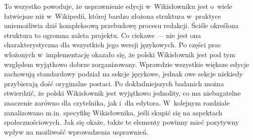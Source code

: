 To wszystko powoduje, że usprawnienie edycji w~Wikisłowniku jest o~wiele łatwiejsze niż w~Wikipedii, której bardzo złożona struktura w~praktyce uniemożliwia dziś kompleksową przebudowę procesu redakcji. Ściśle określona struktura to ogromna zaleta projektu. Co ciekawe --- nie jest ona charakterystyczna dla wszystkich jego wersji językowych. Po części prac włożonych w~implementację okazało się, że polski Wikisłownik jest pod tym względem wyjątkowo dobrze zorganizowany. Wprawdzie wszystkie większe edycje zachowują standardowy podział na sekcje językowe, jednak owe sekcje niekiedy przybierają dość oryginalne postaci. Po dokładniejszych badanich można stwierdzić, że polski Wikisłownik jest wyjątkowo jednolity, co ma niebagatelne znaczenie zarówno dla czytelnika, jak i~dla edytora. W~kolejnym rozdziale zanalizowano m.in. specyfikę Wikisłownika, jeśli skupić się na aspektach społecznościowych. Jak się okaże, także te elementy powinny mieć pozytywny wpływ na możliwość wprowadzenia usprawnień.
